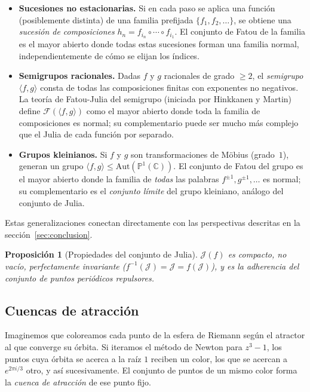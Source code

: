 \documentclass[11pt,a4paper]{article}
\theoremstyle{plain}
\newtheorem{proposicion}[teorema]{Proposición}
\theoremstyle{definition}
\theoremstyle{remark}
\newcommand{\Puno}{\mathbb{P}^1(\mathbb{C})}
\begin{document}
\begin{itemize}
  \item \textbf{Sucesiones no estacionarias.}
        Si en cada paso se aplica una función (posiblemente distinta) de
        una familia prefijada $\{f_1,f_2,\ldots\}$, se obtiene una
        \emph{sucesión de composiciones}
        $h_n = f_{i_n}\circ\cdots\circ f_{i_1}$.
        El conjunto de Fatou de la familia es el mayor abierto donde
        todas estas sucesiones forman una familia normal,
        independientemente de cómo se elijan los índices.
  \item \textbf{Semigrupos racionales.}
        Dadas $f$ y $g$ racionales de grado $\geq 2$, el
        \emph{semigrupo} $\langle f,g\rangle$ consta de todas las
        composiciones finitas con exponentes no negativos.
        La teoría de Fatou-Julia del semigrupo (iniciada por
        Hinkkanen y Martin) define $\mathcal{F}(\langle f,g\rangle)$
        como el mayor abierto donde toda la familia de composiciones
        es normal; su complementario puede ser mucho más complejo
        que el Julia de cada función por separado.
  \item \textbf{Grupos kleinianos.}
        Si $f$ y $g$ son transformaciones de Möbius (grado~$1$),
        generan un grupo $\langle f,g\rangle\leq\mathrm{Aut}(\Puno)$.
        El conjunto de Fatou del grupo es el mayor abierto donde la
        familia de \emph{todas} las palabras $f^{\pm 1},g^{\pm 1},\ldots$
        es normal; su complementario es el \emph{conjunto límite}
        del grupo kleiniano, análogo del conjunto de Julia.
\end{itemize}

Estas generalizaciones conectan directamente con las perspectivas
descritas en la sección~\ref{sec:conclusion}.

\begin{proposicion}[Propiedades del conjunto de Julia]
$\mathcal{J}(f)$ es compacto, no vacío, perfectamente invariante
($f^{-1}(\mathcal{J})=\mathcal{J}=f(\mathcal{J})$), y es la
adherencia del conjunto de puntos periódicos repulsores.
\end{proposicion}

\subsection{Cuencas de atracción}

Imaginemos que coloreamos cada punto de la esfera de Riemann según el atractor al que
converge su órbita. Si iteramos el método de Newton para $z^3-1$, los puntos cuya órbita
se acerca a la raíz $1$ reciben un color, los que se acercan a $e^{2\pi i/3}$ otro, y así
sucesivamente. El conjunto de puntos de un mismo color forma la \emph{cuenca de atracción}
de ese punto fijo.
\end{document}

